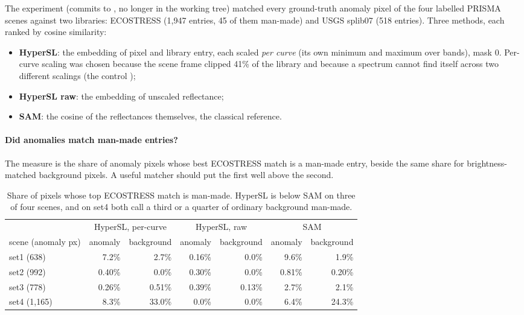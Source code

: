 The experiment  (commits  to , no longer in
the working tree) matched every ground-truth anomaly pixel of the four labelled PRISMA scenes against two libraries:
ECOSTRESS (1,947 entries, 45 of them man-made) and USGS splib07 (518 entries)\tbrk{}. Three methods,
each ranked by cosine similarity:
\begin{itemize}
\item \textbf{HyperSL}: the embedding of pixel and library entry, each scaled \emph{per curve} (its own minimum and maximum
over bands), mask 0. Per-curve scaling was chosen because the scene frame clipped 41\% of the library and because a
spectrum cannot find itself across two different scalings (the control );
\item \textbf{HyperSL raw}: the embedding of unscaled reflectance;
\item \textbf{SAM}: the cosine of the reflectances themselves, the classical reference.
\end{itemize}

\paragraph{Did anomalies match man-made entries?} The measure is the share of anomaly pixels whose best ECOSTRESS match is a
man-made entry, beside the same share for brightness-matched background pixels. A useful matcher should put the first well
above the second.

\begin{table}[htbp]
\centering\small
\begin{tabular}{@{}lrrrrrr@{}}
\toprule
& \multicolumn{2}{c}{HyperSL, per-curve} & \multicolumn{2}{c}{HyperSL, raw} & \multicolumn{2}{c}{SAM} \\
\cmidrule(lr){2-3}\cmidrule(lr){4-5}\cmidrule(lr){6-7}
scene (anomaly px) & anomaly & background & anomaly & background & anomaly & background \\
\midrule
set1 (638) & 7.2\% & 2.7\% & 0.16\% & 0.0\% & 9.6\% & 1.9\% \\
set2 (992) & 0.40\% & 0.0\% & 0.30\% & 0.0\% & 0.81\% & 0.20\% \\
set3 (778) & 0.26\% & 0.51\% & 0.39\% & 0.13\% & 2.7\% & 2.1\% \\
set4 (1,165) & 8.3\% & 33.0\% & 0.0\% & 0.0\% & 6.4\% & 24.3\% \\
\bottomrule
\end{tabular}
\caption{Share of pixels whose top ECOSTRESS match is man-made. HyperSL is below
SAM on three of four scenes, and on set4 both call a third or a quarter of ordinary background man-made.}
\label{tab:hslnorm:m1}
\end{table}

